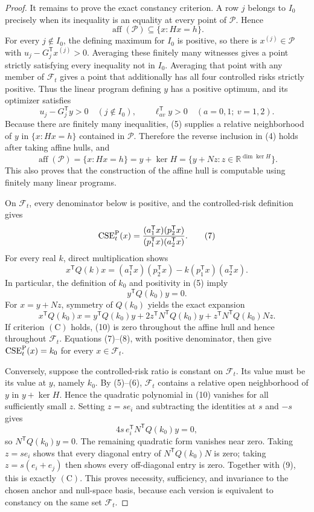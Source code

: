 \documentclass{article}
\begin{document}
\begin{proof}
It remains to prove the exact constancy criterion.  A row \(j\) belongs to \(I_0\) precisely when its inequality is an equality at every point of \(\mathcal P\).  Hence
\[
 \operatorname{aff}(\mathcal P)\subseteq\{x:Hx=h\}.          \tag{4}
\]
For every \(j\notin I_0\), the defining maximum for \(I_0\) is positive, so there is \(x^{(j)}\in\mathcal P\) with
\(u_j-G_j^{\mathsf T}x^{(j)}>0\).  Averaging these finitely many witnesses gives a point strictly satisfying every inequality not in \(I_0\).  Averaging that point with any member of \(\mathcal F_t\) gives a point that additionally has all four controlled risks strictly positive.  Thus the linear program defining \(y\) has a positive optimum, and its optimizer satisfies
\[
 u_j-G_j^{\mathsf T}y>0\quad(j\notin I_0),
 \qquad \ell_{av}^{\mathsf T}y>0\quad(a=0,1;\ v=1,2).       \tag{5}
\]
Because there are finitely many inequalities, (5) supplies a relative neighborhood of \(y\) in \(\{x:Hx=h\}\) contained in \(\mathcal P\).  Therefore the reverse inclusion in (4) holds after taking affine hulls, and
\[
 \operatorname{aff}(\mathcal P)=\{x:Hx=h\}=y+\ker H
 =\{y+Nz:z\in\mathbb R^{\dim\ker H}\}.                     \tag{6}
\]
This also proves that the construction of the affine hull is computable using finitely many linear programs.

On \(\mathcal F_t\), every denominator below is positive, and the controlled-risk definition gives
\[
 \operatorname{CSE}^{\rm P}_t(x)
 =\frac{(a_1^{\mathsf T}x)(p_2^{\mathsf T}x)}
 {(p_1^{\mathsf T}x)(a_2^{\mathsf T}x)}.                    \tag{7}
\]
For every real \(k\), direct multiplication shows
\[
 x^{\mathsf T}Q(k)x
 =(a_1^{\mathsf T}x)(p_2^{\mathsf T}x)
 -k(p_1^{\mathsf T}x)(a_2^{\mathsf T}x).                   \tag{8}
\]
In particular, the definition of \(k_0\) and positivity in (5) imply
\[
 y^{\mathsf T}Q(k_0)y=0.                                    \tag{9}
\]
For \(x=y+Nz\), symmetry of \(Q(k_0)\) yields the exact expansion
\[
 x^{\mathsf T}Q(k_0)x
 =y^{\mathsf T}Q(k_0)y
 +2z^{\mathsf T}N^{\mathsf T}Q(k_0)y
 +z^{\mathsf T}N^{\mathsf T}Q(k_0)Nz.                      \tag{10}
\]
If criterion \((\mathrm C)\) holds, (10) is zero throughout the affine hull and hence throughout \(\mathcal F_t\).  Equations (7)--(8), with positive denominator, then give \(\operatorname{CSE}^{\rm P}_t(x)=k_0\) for every \(x\in\mathcal F_t\).

Conversely, suppose the controlled-risk ratio is constant on \(\mathcal F_t\).  Its value must be its value at \(y\), namely \(k_0\).  By (5)--(6), \(\mathcal F_t\) contains a relative open neighborhood of \(y\) in \(y+\ker H\).  Hence the quadratic polynomial in (10) vanishes for all sufficiently small \(z\).  Setting \(z=se_i\) and subtracting the identities at \(s\) and \(-s\) gives
\[
 4s\,e_i^{\mathsf T}N^{\mathsf T}Q(k_0)y=0,
\]
so \(N^{\mathsf T}Q(k_0)y=0\).  The remaining quadratic form vanishes near zero.  Taking \(z=se_i\) shows that every diagonal entry of \(N^{\mathsf T}Q(k_0)N\) is zero; taking \(z=s(e_i+e_j)\) then shows every off-diagonal entry is zero.  Together with (9), this is exactly \((\mathrm C)\).  This proves necessity, sufficiency, and invariance to the chosen anchor and null-space basis, because each version is equivalent to constancy on the same set \(\mathcal F_t\).


\end{proof}
\end{document}
